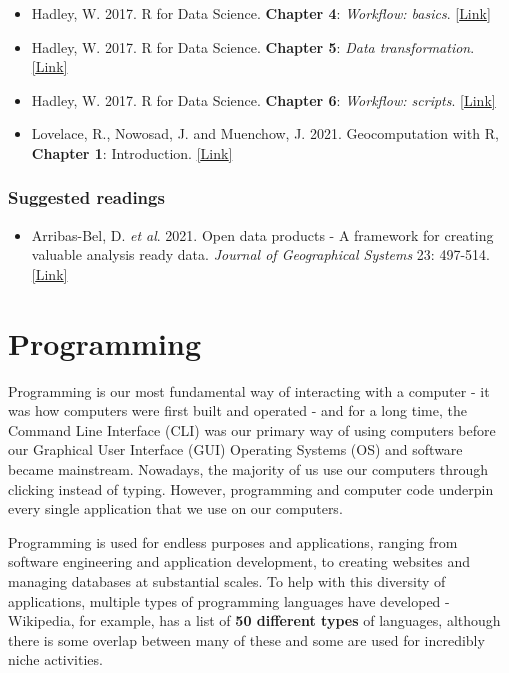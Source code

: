 \documentclass[
]{book}
\providecommand{\tightlist}{%
  \setlength{\itemsep}{0pt}\setlength{\parskip}{0pt}}
\begin{document}
\begin{itemize}
\tightlist
\item
  Hadley, W. 2017. R for Data Science. \textbf{Chapter 4}: \emph{Workflow: basics}. \href{https://r4ds.had.co.nz/workflow-basics.html}{{[}Link{]}}
\item
  Hadley, W. 2017. R for Data Science. \textbf{Chapter 5}: \emph{Data transformation}. \href{https://r4ds.had.co.nz/transform.html}{{[}Link{]}}
\item
  Hadley, W. 2017. R for Data Science. \textbf{Chapter 6}: \emph{Workflow: scripts}. \href{https://r4ds.had.co.nz/workflow-scripts.html}{{[}Link{]}}
\item
  Lovelace, R., Nowosad, J. and Muenchow, J. 2021. Geocomputation with R, \textbf{Chapter 1}: Introduction. \href{https://geocompr.robinlovelace.net/intro.html}{{[}Link{]}}
\end{itemize}

\hypertarget{suggested-readings-3}{%
\subsubsection*{Suggested readings}\label{suggested-readings-3}}

\begin{itemize}
\tightlist
\item
  Arribas-Bel, D. \emph{et al}. 2021. Open data products - A framework for creating valuable analysis ready data. \emph{Journal of Geographical Systems} 23: 497-514. \href{https://doi.org/10.1007/s10109-021-00363-5}{{[}Link{]}}
\end{itemize}

\hypertarget{programming}{%
\section{Programming}\label{programming}}

Programming is our most fundamental way of interacting with a computer - it was how computers were first built and operated - and for a long time, the Command Line Interface (CLI) was our primary way of using computers before our Graphical User Interface (GUI) Operating Systems (OS) and software became mainstream. Nowadays, the majority of us use our computers through clicking instead of typing. However, programming and computer code underpin every single application that we use on our computers.

Programming is used for endless purposes and applications, ranging from software engineering and application development, to creating websites and managing databases at substantial scales. To help with this diversity of applications, multiple types of programming languages have developed - Wikipedia, for example, has a list of \textbf{50 different types} of languages, although there is some overlap between many of these and some are used for incredibly niche activities.
\end{document}
